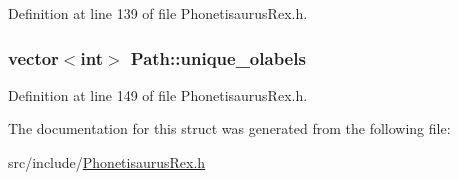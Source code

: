 Definition at line 139 of file Phonetisaurus\+Rex.\+h.

\subsubsection[{unique\+\_\+olabels}]{\setlength{\rightskip}{0pt plus 5cm}vector$<$int$>$ Path\+::unique\+\_\+olabels}\hypertarget{struct_path_ae84b03d32dd11e621850a5e67f00c6e2}{}\label{struct_path_ae84b03d32dd11e621850a5e67f00c6e2}


Definition at line 149 of file Phonetisaurus\+Rex.\+h.



The documentation for this struct was generated from the following file\+:\begin{DoxyCompactItemize}
\item 
src/include/\hyperlink{_phonetisaurus_rex_8h}{Phonetisaurus\+Rex.\+h}\end{DoxyCompactItemize}
